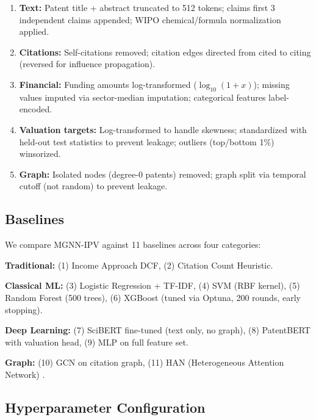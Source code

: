 \documentclass[journal]{IEEEtran}
\begin{document}
\begin{enumerate}
    \item \textbf{Text:} Patent title + abstract truncated to 512 tokens; claims first 3 independent claims appended; WIPO chemical/formula normalization applied.
    \item \textbf{Citations:} Self-citations removed; citation edges directed from cited to citing (reversed for influence propagation).
    \item \textbf{Financial:} Funding amounts log-transformed ($\log_{10}(1 + x)$); missing values imputed via sector-median imputation; categorical features label-encoded.
    \item \textbf{Valuation targets:} Log-transformed to handle skewness; standardized with held-out test statistics to prevent leakage; outliers (top/bottom 1\%) winsorized.
    \item \textbf{Graph:} Isolated nodes (degree-0 patents) removed; graph split via temporal cutoff (not random) to prevent leakage.
\end{enumerate}

\subsection{Baselines}

We compare MGNN-IPV against 11 baselines across four categories:

\textbf{Traditional:} (1) Income Approach DCF, (2) Citation Count Heuristic.

\textbf{Classical ML:} (3) Logistic Regression + TF-IDF, (4) SVM (RBF kernel), (5) Random Forest (500 trees), (6) XGBoost (tuned via Optuna, 200 rounds, early stopping).

\textbf{Deep Learning:} (7) SciBERT fine-tuned (text only, no graph), (8) PatentBERT \cite{lee2020patentbert} with valuation head, (9) MLP on full feature set.

\textbf{Graph:} (10) GCN \cite{kipf2017semi} on citation graph, (11) HAN (Heterogeneous Attention Network) \cite{wang2019heterogeneous}.

\subsection{Hyperparameter Configuration}
\end{document}

